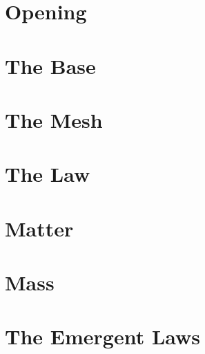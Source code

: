 \documentclass{article}
\begin{document}
\maketitle
\thispagestyle{plain}



\part{Opening}





\part{The Base}








\part{The Mesh}









\part{The Law}





\part{Matter}









\part{Mass}



\part{The Emergent Laws}







\end{document}

